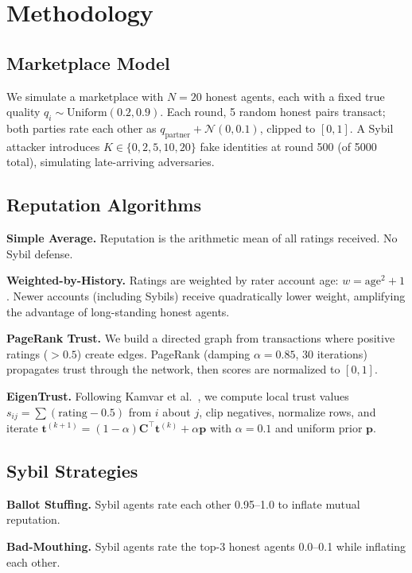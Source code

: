 \documentclass[11pt]{article}
\begin{document}
\section{Methodology}

\subsection{Marketplace Model}

We simulate a marketplace with $N{=}20$ honest agents, each with a fixed true quality $q_i \sim \text{Uniform}(0.2, 0.9)$.
Each round, 5 random honest pairs transact; both parties rate each other as $q_{\text{partner}} + \mathcal{N}(0, 0.1)$, clipped to $[0, 1]$.
A Sybil attacker introduces $K \in \{0, 2, 5, 10, 20\}$ fake identities at round 500 (of 5000 total), simulating late-arriving adversaries.

\subsection{Reputation Algorithms}

\textbf{Simple Average.} Reputation is the arithmetic mean of all ratings received. No Sybil defense.

\textbf{Weighted-by-History.} Ratings are weighted by rater account age: $w = \text{age}^2 + 1$. Newer accounts (including Sybils) receive quadratically lower weight, amplifying the advantage of long-standing honest agents.

\textbf{PageRank Trust.} We build a directed graph from transactions where positive ratings ($> 0.5$) create edges. PageRank (damping $\alpha{=}0.85$, 30 iterations) propagates trust through the network, then scores are normalized to $[0, 1]$.

\textbf{EigenTrust.} Following Kamvar et al.~\cite{kamvar2003eigentrust}, we compute local trust values $s_{ij} = \sum (\text{rating} - 0.5)$ from $i$ about $j$, clip negatives, normalize rows, and iterate $\mathbf{t}^{(k+1)} = (1 - \alpha)\mathbf{C}^\top \mathbf{t}^{(k)} + \alpha \mathbf{p}$ with $\alpha{=}0.1$ and uniform prior $\mathbf{p}$.

\subsection{Sybil Strategies}

\textbf{Ballot Stuffing.} Sybil agents rate each other 0.95--1.0 to inflate mutual reputation.

\textbf{Bad-Mouthing.} Sybil agents rate the top-3 honest agents 0.0--0.1 while inflating each other.
\end{document}
